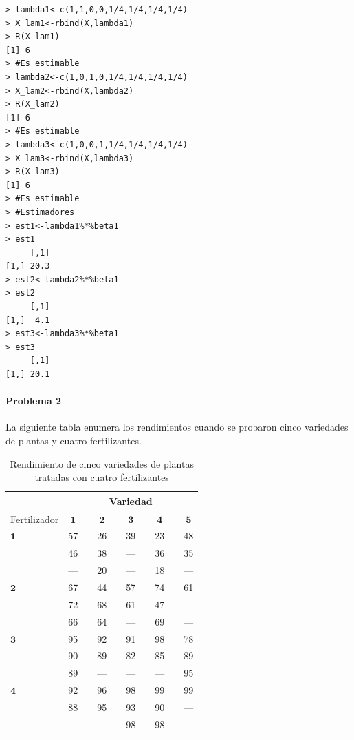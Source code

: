 \documentclass[10pt,a4paper]{report}
\begin{document}
\begin{verbatim}
> lambda1<-c(1,1,0,0,1/4,1/4,1/4,1/4)
> X_lam1<-rbind(X,lambda1)
> R(X_lam1)
[1] 6
> #Es estimable
> lambda2<-c(1,0,1,0,1/4,1/4,1/4,1/4)
> X_lam2<-rbind(X,lambda2)
> R(X_lam2)
[1] 6
> #Es estimable
> lambda3<-c(1,0,0,1,1/4,1/4,1/4,1/4)
> X_lam3<-rbind(X,lambda3)
> R(X_lam3)
[1] 6
> #Es estimable
> #Estimadores
> est1<-lambda1%*%beta1
> est1
     [,1]
[1,] 20.3
> est2<-lambda2%*%beta1
> est2
     [,1]
[1,]  4.1
> est3<-lambda3%*%beta1
> est3
     [,1]
[1,] 20.1
\end{verbatim}




\paragraph{Problema 2} La siguiente tabla enumera los rendimientos cuando se probaron cinco variedades de plantas y cuatro fertilizantes. 
\begin{table}[h]
    \centering
    \begin{tabular}{lcccccccccc}
\hline \hline 
& & \multicolumn{9}{c}{Variedad} \\ \hline
\multicolumn{2}{l}{Fertilizador} & $\mathbf{1}$ & & $\mathbf{2}$ & & $\mathbf{3}$ & & $\mathbf{4}$ & & $\mathbf{5}$ \\
$\mathbf{1}$ & & 57 & & 26 & & 39 & &  23 & & 48 \\
& & 46 & & 38 & & --- & & 36 & & 35 \\
& & --- & & 20 & & --- & & 18 & & --- \\
$\mathbf{2}$ & & 67 & & 44 & & 57 & & 74 & & 61 \\
& & 72 & &  68 & & 61 & & 47 & & --- \\
& & 66 & & 64 & & --- & & 69 & & --- \\
$\mathbf{3}$ & & 95 & & 92 & & 91 & & 98 & & 78 \\
& & 90 & & 89 & & 82 & & 85 & & 89 \\
& & 89 & & --- & & --- & & --- & & 95 \\
$\mathbf{4}$ & & 92 & & 96 & & 98 & & 99 & & 99 \\
& & 88 & & 95 & & 93 & & 90 & & --- \\
& & --- & & --- & & 98 & & 98 & & --- \\ 
\hline \hline
    \end{tabular}
    \caption{Rendimiento de cinco variedades de plantas tratadas con cuatro fertilizantes}
    \label{tab2P2}
\end{table}
\end{document}
